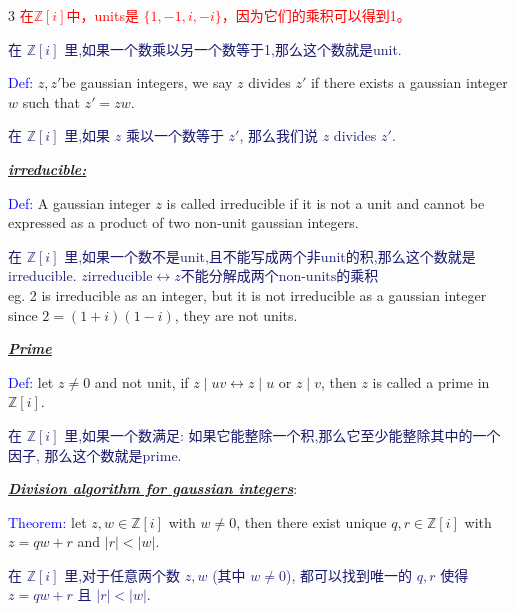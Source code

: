 \documentclass[12pt]{article}
\newcommand{\bulletPoint}[1]{\underline{\textit{\textbf{#1}}}}
\begin{document}
\begin{multicols*}{3}
{\fontsize{5.5pt}{5pt}\selectfont\textcolor{red}{在$\mathbb{Z}[i]$中，units是 $\{1, -1, i, -i\}$，因为它们的乘积可以得到1。}}

{\fontsize{5.5pt}{5pt}\selectfont\textcolor{MidnightBlue}{在 $\mathbb{Z}[i]$ 里,如果一个数乘以另一个数等于1,那么这个数就是unit.}}

\textcolor{blue}{Def:} $z,z'$be gaussian integers, we say $z$ divides $z'$ if there exists a gaussian integer $w$ such that 
\textcolor{magenta!90!black}{$z'=zw$. }

{\fontsize{5.5pt}{5pt}\selectfont\textcolor{MidnightBlue}{在 $\mathbb{Z}[i]$ 里,如果 $z$ 乘以一个数等于 $z'$, 那么我们说 $z$ divides $z'$.}}

\bulletPoint{irreducible:} 

\textcolor{blue}{Def:} A gaussian integer $z$ is called irreducible if it is not a unit and cannot be expressed 
as a product of two non-unit gaussian integers. 

{\fontsize{5.5pt}{5pt}\selectfont\textcolor{MidnightBlue}{在 $\mathbb{Z}[i]$ 里,如果一个数不是unit,且不能写成两个非unit的积,那么这个数就是irreducible.
$z \text{irreducible}\longleftrightarrow z\text{不能分解成两个non-units的乘积}$}} \\[2pt]

eg. 2 is irreducible as an integer, but it is not irreducible as a gaussian integer since $2=(1+i)(1-i)$, they are not units.

\bulletPoint{Prime }

\textcolor{blue}{Def:} let $z\neq 0$ and not unit, if 
\textcolor{magenta!90!black}{ $z\mid uv \longleftrightarrow z\mid u$ or $z\mid v$,} 
then $z$ is called a prime in $\mathbb{Z}[i]$. 

{\fontsize{5.5pt}{5pt}\selectfont\textcolor{MidnightBlue}{在 $\mathbb{Z}[i]$ 里,如果一个数满足: 
如果它能整除一个积,那么它至少能整除其中的一个因子, 那么这个数就是prime.}}





\bulletPoint{Division algorithm for gaussian integers}:

\textcolor{blue}{Theorem:}  let $z,w \in \mathbb{Z}[i]$ with $w \neq 0$, then there exist unique $q,r \in \mathbb{Z}[i]$ with
$z=qw+r$ and $|r|<|w|$.

{\fontsize{5.5pt}{5pt}\selectfont\textcolor{MidnightBlue}{在 $\mathbb{Z}[i]$ 里,对于任意两个数 $z,w$ (其中 $w\neq 0$), 都可以找到唯一的 $q,r$ 
使得 $z=qw+r$ 且 $|r|<|w|$.}}







\end{multicols*}
\end{document}
